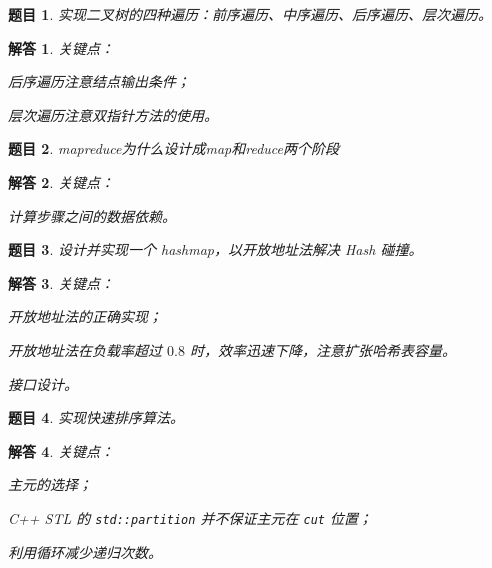 \documentclass[UTF8, final]{ctexart}
\newtheorem{question}{题目}
\newtheorem{solution}{解答}
\begin{document}
\begin{question}
实现二叉树的四种遍历：前序遍历、中序遍历、后序遍历、层次遍历。
\end{question}
\begin{solution}
关键点：
\begin{compactitem}
    \item 后序遍历注意结点输出条件；
    \item 层次遍历注意双指针方法的使用。
\end{compactitem}

\end{solution}

\begin{question}
mapreduce为什么设计成map和reduce两个阶段
\end{question}
\begin{solution}
关键点：
\begin{compactitem}
    \item 计算步骤之间的数据依赖。
\end{compactitem}
\end{solution}

\begin{question}
设计并实现一个 hashmap，以开放地址法解决 Hash 碰撞。
\end{question}
\begin{solution}
关键点：
\begin{compactitem}
    \item 开放地址法的正确实现；
    \item 开放地址法在负载率超过 $0.8$ 时，效率迅速下降，注意扩张哈希表容量。
    \item 接口设计。
\end{compactitem}

\end{solution}

\begin{question}
实现快速排序算法。
\end{question}
\begin{solution}
关键点：
\begin{compactitem}
    \item 主元的选择；
    \item C++ STL 的 \lstinline[style = lcpp]|std::partition| 并不保证主元在 \lstinline[style = lcpp]|cut| 位置；
    \item 利用循环减少递归次数。
\end{compactitem}

\end{solution}
\end{document}

